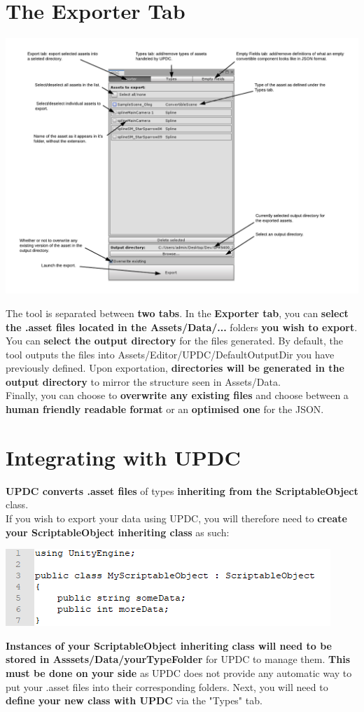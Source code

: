 \documentclass[10pt,a4paper]{article}
\begin{document}
\section{The Exporter Tab}
\begin{center}
\includegraphics[scale=0.55]{exportUi}
\end{center}
The tool is separated between \textbf{two tabs}. In the \textbf{Exporter tab}, you can \textbf{select the .asset files located in the Assets/Data/...} folders \textbf{you wish to export}.
You can \textbf{select the output directory} for the files generated. By default, the tool outputs the files into Assets/Editor/UPDC/DefaultOutputDir you have previously defined.
Upon exportation, \textbf{directories will be generated in the output directory} to mirror the structure seen in Assets/Data.\\
Finally, you can choose to \textbf{overwrite any existing files} and choose between a \textbf{human friendly readable format} or an \textbf{optimised one} for the JSON.
\newpage

\section{Integrating with UPDC}
\textbf{UPDC converts .asset files} of types \textbf{inheriting from the ScriptableObject} class.\\
If you wish to export your data using UPDC, you will therefore need to \textbf{create your ScriptableObject inheriting class} as such:
\begin{center}
\includegraphics[scale=1.0]{soExample}
\end{center}
\textbf{Instances of your ScriptableObject inheriting class will need to be stored in Asssets/Data/yourTypeFolder} for UPDC to manage them. \textbf{This must be done on your side} as UPDC does not provide any automatic way to put your .asset files into their corresponding folders.
Next, you will need to \textbf{define your new class with UPDC} via the "Types" tab.
\end{document}
